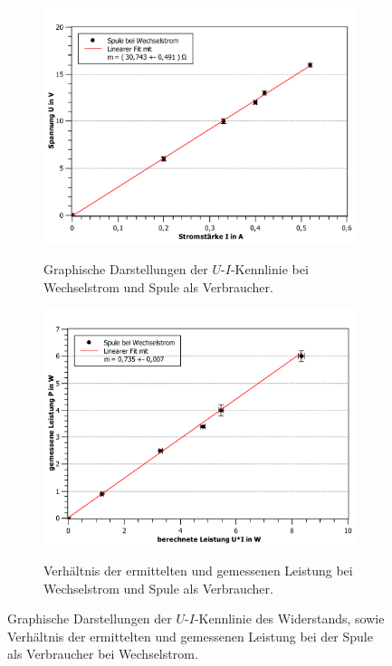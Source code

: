 \begin{figure}[ht]
	\label{fig:Spule_wechsel}
	\centering	
	\begin{subfigure}{0.70\textwidth}
		\centering
		\includegraphics[width=\textwidth]{auswertung/spule-wechsel-Widerstand.pdf}
		\label{fig:7}
		\caption{Graphische Darstellungen der $U$-$I$-Kennlinie bei Wechselstrom und Spule als Verbraucher.}	
	\end{subfigure}
	\begin{subfigure}{0.70\textwidth}
		\centering
		\includegraphics[width=\textwidth]{auswertung/spule-wechsel-Leistung.pdf}
		\label{fig:8}
		\caption{Verhältnis der ermittelten und gemessenen Leistung bei Wechselstrom und Spule als Verbraucher.}	
	\end{subfigure}
	\caption{Graphische Darstellungen der $U$-$I$-Kennlinie des Widerstands, sowie Verhältnis der ermittelten und gemessenen Leistung bei der Spule als Verbraucher bei Wechselstrom.}
\end{figure}
